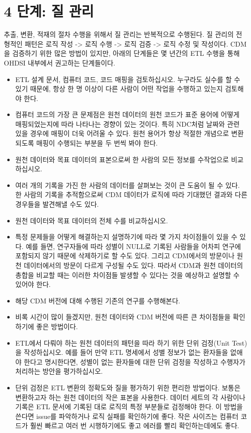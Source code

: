 \documentclass[11pt]{book}
\providecommand{\tightlist}{%
  \setlength{\itemsep}{0pt}\setlength{\parskip}{0pt}}
\theoremstyle{definition}
\theoremstyle{definition}
\theoremstyle{definition}
\theoremstyle{remark}
\begin{document}
\section{4 단계: 질 관리}\label{--}

추출, 변환, 적재의 절차 수행을 위해서 질 관리는 반복적으로 수행된다. 질
관리의 전형적인 패턴은 로직 작성 -\textgreater{} 로직 수행
-\textgreater{} 로직 검증 -\textgreater{} 로직 수정 및 작성이다. CDM을
검증하기 위한 많은 방법이 있지만, 아래의 단계들은 몇 년간의 ETL 수행을
통해 OHDSI 내부에서 권고하는 단계들이다. 

\begin{itemize}
\tightlist
\item
  ETL 설계 문서, 컴퓨터 코드, 코드 매핑을 검토하십시오. 누구라도 실수를
  할 수 있기 때문에, 항상 한 명 이상이 다른 사람이 어떤 작업을 수행하고
  있는지 검토해야 한다.
\item
  컴퓨터 코드의 가장 큰 문제점은 원천 데이터의 원천 코드가 표준 용어에
  어떻게 매핑되었는지에 따라 나타나는 경향이 있는 것이다. 특히 NDC처럼
  날짜와 관련 있을 경우에 매핑이 더욱 어려울 수 있다. 원천 용어가 항상
  적절한 개념으로 변환되도록 매핑이 수행되는 부분을 두 번씩 봐야 한다.
\item
  원천 데이터와 목표 데이터의 표본으로써 한 사람의 모든 정보를
  수작업으로 비교하십시오.
\item
  여러 개의 기록을 가진 한 사람의 데이터를 살펴보는 것이 큰 도움이 될 수
  있다. 한 사람의 기록을 추적함으로써 CDM 데이터가 로직에 따라 기대했던
  결과와 다른 경우들을 발견해낼 수도 있다.
\item
  원천 데이터와 목표 데이터의 전체 수를 비교하십시오.
\item
  특정 문제들을 어떻게 해결하는지 설명하기에 따라 몇 가지 차이점들이
  있을 수 있다. 예를 들면, 연구자들에 따라 성별이 NULL로 기록된 사람들을
  어차피 연구에 포함되지 않기 때문에 삭제하기로 할 수도 있다. 그리고
  CDM에서의 방문이나 원천 데이터에서의 방문이 다르게 구성될 수도 있다.
  따라서 CDM과 원천 데이터의 총합을 비교할 때는 이러한 차이점들 발생할
  수 있다는 것을 예상하고 설명할 수 있어야 한다.
\item
  해당 CDM 버전에 대해 수행된 기존의 연구를 수행해본다.
\item
  비록 시간이 많이 들겠지만, 원천 데이터와 CDM 버전에 따른 큰 차이점들을
  확인하기에 좋은 방법이다.
\item
  ETL에서 다뤄야 하는 원천 데이터의 패턴을 따라 하기 위한 단위 검정(Unit
  Test)을 작성하십시오. 예를 들어 만약 ETL 명세에서 성별 정보가 없는
  환자들을 없애야 한다고 명시한다면, 성별이 없는 환자들에 대한 단위
  검정을 작성하고 수행자가 처리하는 방안을 평가하십시오.
\item
  단위 검정은 ETL 변환의 정확도와 질을 평가하기 위한 편리한 방법이다.
  보통은 변환하고자 하는 원천 데이터의 작은 표본을 사용한다. 데이터
  세트의 각 사람이나 기록은 ETL 문서에 기록된 대로 로직의 특정 부분들로
  검정해야 한다. 이 방법을 쓴다면 issue를 파악하거나 로직 실패를
  확인하기에 좋다. 작은 사이즈는 컴퓨터 코드가 훨씬 빠르고 여러 번
  시행하기에도 좋고 에러를 빨리 확인하는데에도 좋다.
\end{itemize}
\end{document}

